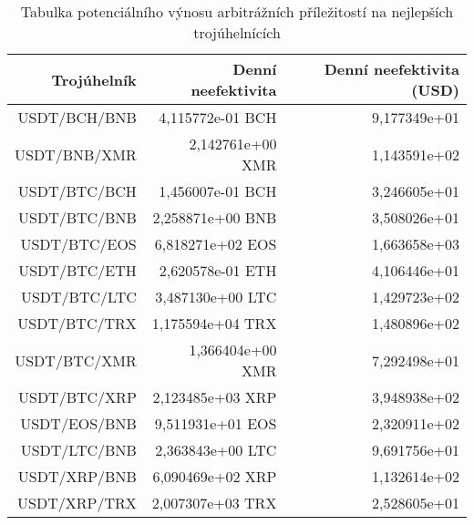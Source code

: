 \begin{table}\centering
\caption{Tabulka potenciálního výnosu arbitrážních příležitostí na nejlepších trojúhelnících}
\label{table_gains_best}
\begin{tabular}{|| r | r | r ||}\hline Trojúhelník & Denní neefektivita & Denní neefektivita (USD)\\ [0.5ex]
 \hline\hline USDT/BCH/BNB & 4,115772e-01 BCH & 9,177349e+01\\ 
 \hline USDT/BNB/XMR & 2,142761e+00 XMR & 1,143591e+02\\ 
 \hline USDT/BTC/BCH & 1,456007e-01 BCH & 3,246605e+01\\ 
 \hline USDT/BTC/BNB & 2,258871e+00 BNB & 3,508026e+01\\ 
 \hline USDT/BTC/EOS & 6,818271e+02 EOS & 1,663658e+03\\ 
 \hline USDT/BTC/ETH & 2,620578e-01 ETH & 4,106446e+01\\ 
 \hline USDT/BTC/LTC & 3,487130e+00 LTC & 1,429723e+02\\ 
 \hline USDT/BTC/TRX & 1,175594e+04 TRX & 1,480896e+02\\ 
 \hline USDT/BTC/XMR & 1,366404e+00 XMR & 7,292498e+01\\ 
 \hline USDT/BTC/XRP & 2,123485e+03 XRP & 3,948938e+02\\ 
 \hline USDT/EOS/BNB & 9,511931e+01 EOS & 2,320911e+02\\ 
 \hline USDT/LTC/BNB & 2,363843e+00 LTC & 9,691756e+01\\ 
 \hline USDT/XRP/BNB & 6,090469e+02 XRP & 1,132614e+02\\ 
 \hline USDT/XRP/TRX & 2,007307e+03 TRX & 2,528605e+01\\ 
 \hline
\end{tabular}
\end{table}